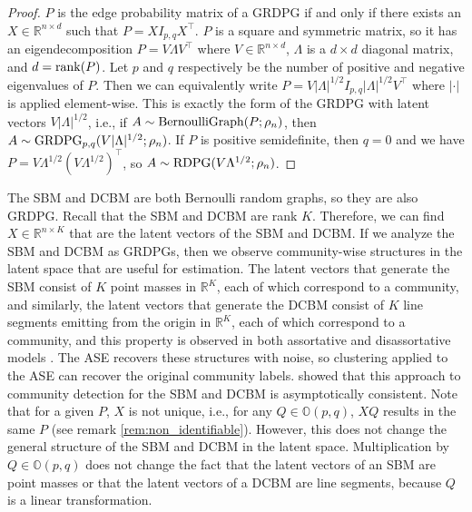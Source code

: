 \documentclass[
  11pt,
]{article}
\theoremstyle{definition}
\theoremstyle{definition}
\theoremstyle{definition}
\theoremstyle{definition}
\theoremstyle{remark}
\begin{document}
\begin{proof}
$P$ is the edge probability matrix of a GRDPG if and only if there exists an $X \in \mathbb{R}^{n \times d}$ such that $P = X I_{p,q} X^\top$. 
$P$ is a square and symmetric matrix, so it has an eigendecomposition $P = V \Lambda V^\top$ where $V \in \mathbb{R}^{n \times d}$, $\Lambda$ is a $d \times d$ diagonal matrix, and $d = \mathrm{rank}(P)$. 
Let $p$ and $q$ respectively be the number of positive and negative eigenvalues of $P$. 
Then we can equivalently write $P = V |\Lambda|^{1/2} I_{p,q} |\Lambda|^{1/2} V^\top$ where $|\cdot|$ is applied element-wise. 
This is exactly the form of the GRDPG with latent vectors $V |\Lambda|^{1/2}$,
i.e., if $A \sim \mathrm{BernoulliGraph}(P; \rho_n)$, then $A \sim \mathrm{GRDPG}_{p,q}(V |\Lambda|^{1/2}; \rho_n)$. 
If $P$ is positive semidefinite, then $q = 0$ and we have $P = V \Lambda^{1/2} (V \Lambda^{1/2})^\top$, so $A \sim \mathrm{RDPG}(V \Lambda^{1/2}; \rho_n)$. 
\end{proof}

The SBM and DCBM are both Bernoulli random graphs, so they are also GRDPG.
Recall that the SBM and DCBM are rank \(K\).
Therefore, we can find \(X \in \mathbb{R}^{n \times K}\) that are the latent vectors of the SBM and DCBM.
If we analyze the SBM and DCBM as GRDPGs, then we observe community-wise structures in the latent space that are useful for estimation.
The latent vectors that generate the SBM consist of \(K\) point masses in \(\mathbb{R}^K\), each of which correspond to a community, and similarly, the latent vectors that generate the DCBM consist of \(K\) line segments emitting from the origin in \(\mathbb{R}^K\), each of which correspond to a community, and this property is observed in both assortative and disassortative models \citep{rubindelanchy2017statistical}.
The ASE recovers these structures with noise, so clustering applied to the ASE can recover the original community labels.
\citet{rubindelanchy2017statistical} showed that this approach to community detection for the SBM and DCBM is asymptotically consistent.
Note that for a given \(P\), \(X\) is not unique, i.e., for any \(Q \in \mathbb{O}(p, q)\), \(X Q\) results in the same \(P\) (see remark \ref{rem:non_identifiable}).
However, this does not change the general structure of the SBM and DCBM in the latent space.
Multiplication by \(Q \in \mathbb{O}(p,q)\) does not change the fact that the latent vectors of an SBM are point masses or that the latent vectors of a DCBM are line segments, because \(Q\) is a linear transformation.
\end{document}
